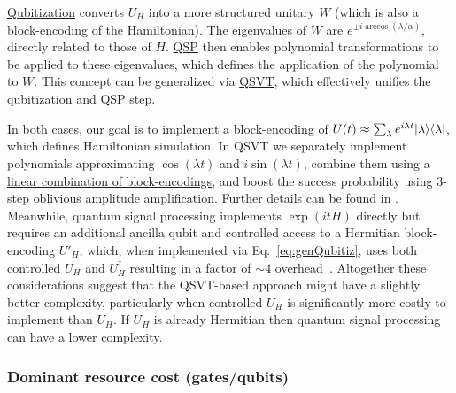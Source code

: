 \begin{refsection}
\hyperref[prim:Qubitization]{Qubitization} converts $U_H$ into a more structured unitary $W$ (which is also a block-encoding of the Hamiltonian). The eigenvalues of $W$ are $e^{\pm i \arccos(\lambda / \alpha)}$, directly related to those of $H$. \hyperref[prim:QSP]{QSP} then enables polynomial transformations to be applied to these eigenvalues, which defines the application of the polynomial to $W$. This concept can be generalized via \hyperref[prim:QSVT]{QSVT}, which effectively unifies the qubitization and QSP step. 

In both cases, our goal is to implement a block-encoding of $U(t) \approx \sum_\lambda e^{i \lambda t} \lvert\lambda\rangle \langle\lambda\rvert$, which defines Hamiltonian simulation. In QSVT we separately implement polynomials approximating $\cos(\lambda t)$ and $i\sin(\lambda t)$, combine them using a \hyperref[prim:ManipulatingBlockEncodings]{linear combination of block-encodings}, and boost the success probability using 3-step \hyperref[prim:AA]{oblivious amplitude amplification}. Further details can be found in \cite{gilyen2018QSingValTransfArXiv,martyn2021GrandUnificationQAlgs}. Meanwhile, quantum signal processing implements $\exp( i t H)$ directly but requires an additional ancilla qubit and controlled access to a Hermitian block-encoding $U'_H$, which, when implemented via Eq.~\eqref{eq:genQubitiz}, uses both controlled $U_H$ and $U_H^\dagger$ resulting in a factor of $\sim 4$ overhead~\cite{low2016HamSimQubitization}. Altogether these considerations suggest that the QSVT-based approach might have a slightly better complexity, particularly when controlled $U_H$ is significantly more costly to implement than $U_H$. If $U_H$ is already Hermitian then quantum signal processing can have a lower complexity.





\subsubsection*{Dominant resource cost (gates/qubits)}


\end{refsection}
